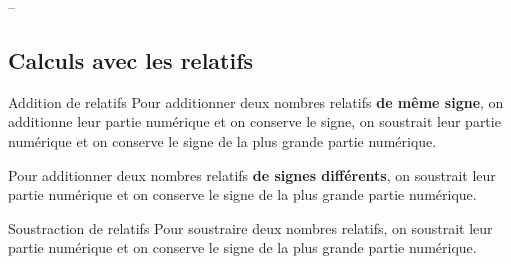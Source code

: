 \newpage
--
\newpage

\begin{pageCours} %


\section{Calculs avec les relatifs}

\begin{minipage}{0.5\linewidth}
\begin{ThT}{Addition de relatifs}
Pour additionner deux nombres relatifs \textbf{de même signe}, on additionne leur partie numérique et on conserve le signe, on soustrait leur partie numérique et on conserve le signe de la plus grande partie numérique.

Pour additionner deux nombres relatifs \textbf{de signes différents}, on soustrait leur partie numérique et on conserve le signe de la plus grande partie numérique.
\end{ThT}


\begin{ThT}{Soustraction de relatifs}
Pour soustraire deux nombres relatifs, on soustrait leur partie numérique et on conserve le signe de la plus grande partie numérique.
\end{ThT}

\end{minipage}
\begin{minipage}{0.5\linewidth}

\begin{Rq} 


\end{Rq}
\end{minipage}
\end{pageCours}
